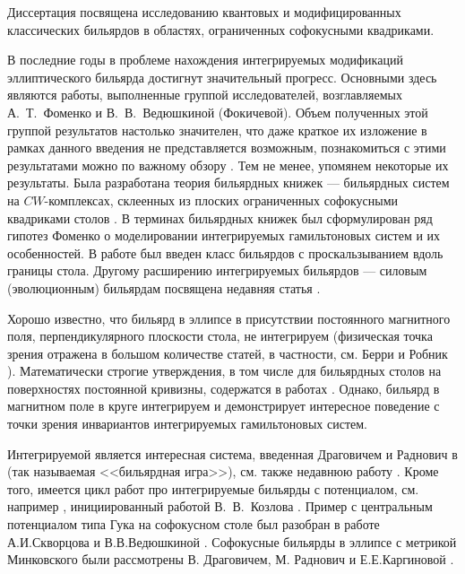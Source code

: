 
{\actuality} 
Диссертация посвящена исследованию квантовых и модифицированных классических бильярдов в областях, ограниченных софокусными квадриками.

В последние годы в проблеме нахождения интегрируемых модификаций эллиптического бильярда достигнут значительный прогресс. Основными здесь являются работы, выполненные группой исследователей, возглавляемых А.~Т.~Фоменко и В.~В.~Ведюшкиной (Фокичевой). 
Объем полученных этой группой результатов настолько значителен, что даже краткое их изложение  в рамках данного введения не представляется возможным, познакомиться с этими результатами можно по важному обзору \cite{FomVed23}.
Тем не менее, упомянем некоторые их результаты.
Была разработана теория бильярдных книжек --- бильярдных систем на  $CW$-комплексах, склеенных из плоских ограниченных софокусными квадриками столов \cite{VedFom19}.
В терминах бильярдных книжек был сформулирован ряд гипотез Фоменко о моделировании интегрируемых гамильтоновых систем и их особенностей.
В работе \cite{zbMATH07344445}  был введен класс бильярдов с проскальзыванием вдоль границы стола. Другому расширению интегрируемых бильярдов --- силовым (эволюционным) бильярдам посвящена недавняя статья \cite{FomVed22}.  
 

Хорошо известно, что бильярд в эллипсе в присутствии постоянного магнитного поля, перпендикулярного плоскости стола, не интегрируем (физическая точка зрения отражена в большом количестве статей, в частности, см. Берри и Робник \cite{berry1985, berry1986}). 
Математически строгие утверждения, в том числе для бильярдных столов на поверхностях постоянной кривизны,  содержатся в работах \cite{bm2019, zbMATH06661562, bm2020}.
Однако, бильярд в магнитном поле в круге интегрируем и демонстрирует интересное поведение с точки зрения инвариантов интегрируемых гамильтоновых систем.

Интегрируемой является интересная система, введенная Драговичем и Раднович в \cite{DraGasRad22} (так называемая <<бильярдная игра>>), см. также недавнюю работу \cite{wire}.
Кроме того, имеется цикл работ про интегрируемые бильярды с потенциалом, см. например \cite{Dra1, Dra4}, инициированный работой В.~В.~Козлова \cite{Kozlov}.
Пример с центральным потенциалом типа Гука на софокусном столе был разобран в работе А.И.Скворцова и В.В.Ведюшкиной \cite{VedSkv22}.
Софокусные бильярды в эллипсе с метрикой Минковского были рассмотрены В. Драговичем, М. Раднович \cite{DraRad15} и Е.Е.Каргиновой \cite{Kar19, Kar20}. 

